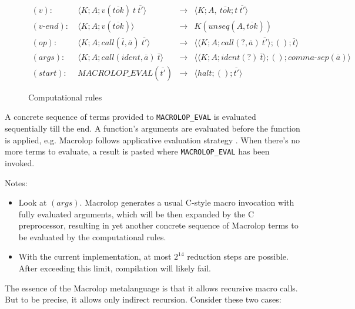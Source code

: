 \documentclass[12pt]{article}
\theoremstyle{break}
\begin{document}
\begin{figure}[H]
    \caption{Computational rules}

    \begin{align*}
        (v): \ & \langle K; A; v(\overline{tok}) \ t \ \overline{t'} \rangle & \to &
            \langle K; A, \ \overline{tok}; t \ \overline{t'} \rangle \\
        (v\mbox{-}end): \ & \langle K; A; v(\overline{tok}) \rangle & \to &
            K(unseq(A, \overline{tok})) \\
        (op): \ & \langle K; A; call(\overline{t}, \overline{a}) \ \overline{t'} \rangle & \to &
            \langle \langle K; A; call(?, \overline{a}) \ \overline{t'} \rangle; (); \overline{t} \rangle \\
        (args): \ & \langle K; A; call(ident, \overline{a}) \ \overline{t} \rangle & \to
            & \langle \langle K; A; ident(?) \ \overline{t} \rangle; (); comma\mbox{-}sep(\overline{a}) \rangle \\
        (start): \ & MACROLOP\_EVAL(\overline{t'}) & \to &
            \langle halt; (); \overline{t'} \rangle
    \end{align*}
\end{figure}

A concrete sequence of terms provided to \texttt{MACROLOP\_EVAL} is evaluated sequentially till the end. A function's arguments
are evaluated before the function is applied, e.g. Macrolop follows applicative
evaluation strategy \cite{ApplicativeEvaluationStrategy}. When there's no more terms
to evaluate, a result is pasted where \texttt{MACROLOP\_EVAL} has been invoked.

Notes:

\begin{itemize}
    \item Look at $(args)$. Macrolop generates a usual C-style macro invocation with
    fully evaluated arguments, which will be then expanded by the C preprocessor, resulting
    in yet another concrete sequence of Macrolop terms to be evaluated by the computational
    rules.
    \item With the current implementation, at most $2^{14}$ reduction steps are
    possible. After exceeding this limit, compilation will likely fail.
\end{itemize}

The essence of the Macrolop metalanguage is that it allows recursive macro calls. But
to be precise, it allows only indirect recursion. Consider these two cases:
\end{document}
